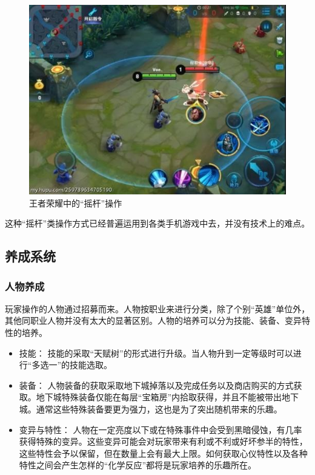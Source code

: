 \documentclass[UTF8,AutoFakeBold=1,AutoFakeSlant,zihao=-4]{cucthesis}
\begin{document}
\begin{figure}[ht]
    \centering  
    \includegraphics[scale=0.64]{imgs/王者荣耀摇杆.jpg}
    \caption{王者荣耀中的“摇杆”操作}
    \label{fig:stick02}
\end{figure}

这种“摇杆”类操作方式已经普遍运用到各类手机游戏中去，并没有技术上的难点。



\subsection{养成系统}

\subsubsection{人物养成}
玩家操作的人物通过招募而来。人物按职业来进行分类，除了个别“英雄”单位外，其他同职业人物并没有太大的显著区别。人物的培养可以分为技能、装备、变异特性的培养。

\begin{itemize}
    \item 技能：
    技能的采取“天赋树”的形式进行升级。当人物升到一定等级时可以进行“多选一”的技能选取。
    \item 装备：
    人物装备的获取采取地下城掉落以及完成任务以及商店购买的方式获取。地下城特殊装备仅能在每层“宝箱房”内拾取获得，并且不能被带出地下城。通常这些特殊装备要更为强力，这也是为了突出随机带来的乐趣。
    \item 变异与特性：
    人物在一定亮度以下或在特殊事件中会受到黑暗侵蚀，有几率获得特殊的变异。这些变异可能会对玩家带来有利或不利或好坏参半的特性，这些特性会予以保留，但在数量上会有最大上限。如何获取心仪特性以及各种特性之间会产生怎样的“化学反应”都将是玩家培养的乐趣所在。
\end{itemize}
\end{document}
